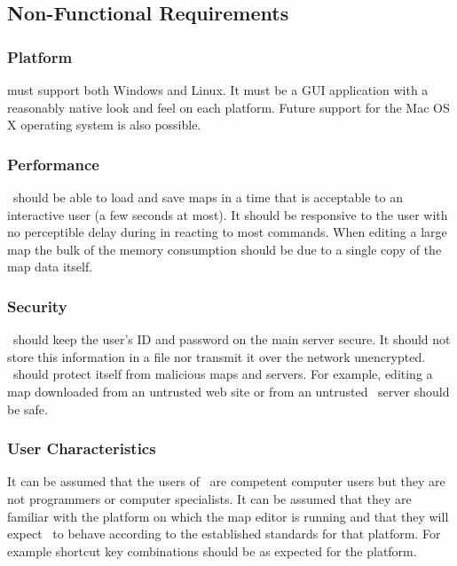 
\subsection{Non-Functional Requirements}

\subsubsection*{Platform}

\MapEditor must support both Windows and Linux. It must be a GUI application with a reasonably native look and feel on each platform. Future support for the Mac OS X operating system is also possible.

\subsubsection*{Performance}

\MapEditor\ should be able to load and save maps in a time that is acceptable to an interactive user (a few seconds at most). It should be responsive to the user with no perceptible delay during in reacting to most commands. When editing a large map the bulk of the memory consumption should be due to a single copy of the map data itself.

\subsubsection*{Security}

\MapEditor\ should keep the user's ID and password on the main server secure. It should not store this information in a file nor transmit it over the network unencrypted. \MapEditor\ should protect itself from malicious maps and servers. For example, editing a map downloaded from an untrusted web site or from an untrusted \VTank\ server should be safe.

\subsubsection*{User Characteristics}

It can be assumed that the users of \MapEditor\ are competent computer users but they are not programmers or computer specialists. It can be assumed that they are familiar with the platform on which the map editor is running and that they will expect \MapEditor\ to behave according to the established standards for that platform. For example shortcut key combinations should be as expected for the platform.

